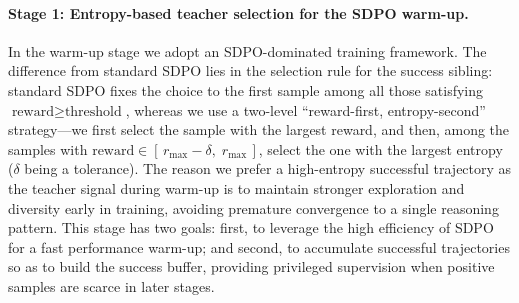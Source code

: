 \documentclass{article}
\begin{document}
\paragraph{Stage 1: Entropy-based teacher selection for the SDPO warm-up.}
In the warm-up stage we adopt an SDPO-dominated training framework. The difference from standard SDPO lies in the selection rule for the success sibling: standard SDPO fixes the choice to the first sample among all those satisfying $\text{reward}\ge\text{threshold}$, whereas we use a two-level ``reward-first, entropy-second'' strategy---we first select the sample with the largest reward, and then, among the samples with $\text{reward}\in[\,r_{\max}-\delta,\;r_{\max}\,]$, select the one with the largest entropy ($\delta$ being a tolerance). The reason we prefer 
a high-entropy successful trajectory as the teacher signal during warm-up is to maintain stronger exploration and diversity early in training, avoiding premature convergence to a single reasoning pattern. This stage has two goals: first, to leverage the high efficiency of SDPO for a fast performance warm-up; and second, to accumulate successful trajectories so as to build the success buffer, providing privileged supervision when positive samples are scarce in later stages.
\end{document}
